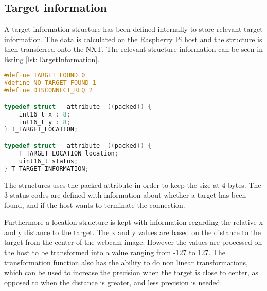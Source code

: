 \subsection{Target information}
A target information structure has been defined internally to store relevant target information.
The data is calculated on the Raspberry Pi host and the structure is then transferred onto the NXT.
The relevant structure information can be seen in listing \ref{lst:TargetInformation}.
\begin{lstlisting}[language=C, label={lst:TargetInformation},caption={Target information structure from target\_location.h}]
#define TARGET_FOUND 0
#define NO_TARGET_FOUND 1
#define DISCONNECT_REQ 2

typedef struct __attribute__((packed)) {
	int16_t x : 8;
	int16_t y : 8;
} T_TARGET_LOCATION;

typedef struct __attribute__((packed)) {
	T_TARGET_LOCATION location;
	uint16_t status;
} T_TARGET_INFORMATION;
\end{lstlisting}

The structures uses the packed attribute in order to keep the size at 4 bytes.
The 3 status codes are defined with information about whether a target has been found, and if the host wants to terminate the connection.

Furthermore a location structure is kept with information regarding the relative x and y distance to the target.
The x and y values are based on the distance to the target from the center of the webcam image. 
However the values are processed on the host to be transformed into a value ranging from -127 to 127. 
The transformation function also has the ability to do non linear transformations, which can be used to increase the precision when the target is close to center, as opposed to when the distance is greater, and less precision is needed.
